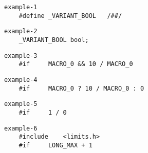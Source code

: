 \documentclass{jsarticle}
\begin{document}
\setlength{\baselineskip}{10pt}

\begin{verbatim}
example-1
    #define _VARIANT_BOOL   /##/
\end{verbatim}

\begin{verbatim}
example-2
    _VARIANT_BOOL bool;
\end{verbatim}

\vspace{0pt}
\begin{verbatim}
example-3
    #if     MACRO_0 && 10 / MACRO_0
\end{verbatim}

\begin{verbatim}
example-4
    #if     MACRO_0 ? 10 / MACRO_0 : 0
\end{verbatim}

\begin{verbatim}
example-5
    #if     1 / 0
\end{verbatim}

\vspace{0pt}
\begin{verbatim}
example-6
    #include    <limits.h>
    #if     LONG_MAX + 1
\end{verbatim}
\end{document}
